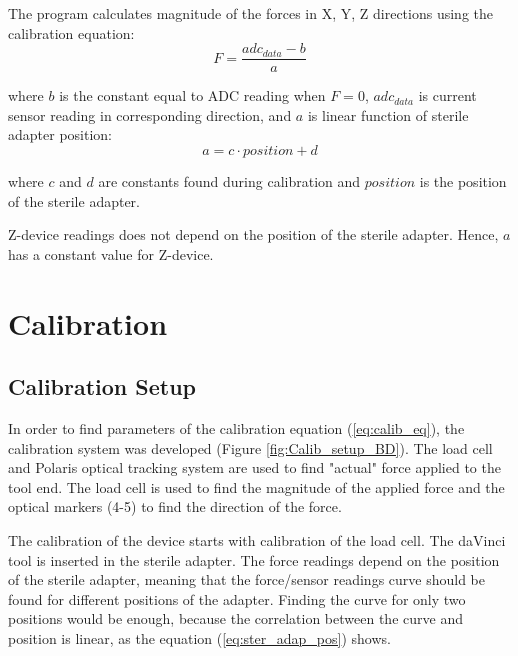 The program calculates magnitude of the forces in X, Y, Z directions using the calibration equation:
\begin{equation}\label{eq:calib_eq}
F = \frac{adc_{data} - b}{a}
\end{equation}

where $b$ is the constant equal to ADC reading when $F = 0$, $adc_{data}$ is current sensor reading in corresponding direction, and $a$ is linear function of sterile adapter position:
\begin{equation}\label{eq:ster_adap_pos}
a = c \cdot position + d
\end{equation}

where $c$ and $d$ are constants found during calibration and $position$ is the position of the sterile adapter.

Z-device readings does not depend on the position of the sterile adapter. Hence, $a$ has a constant value for Z-device.
 
	
\section{Calibration}
\label{section:Calibration}

	\subsection{Calibration Setup}
	\label{sec:CalSetup}
	In order to find parameters of the calibration equation (\ref{eq:calib_eq}), the calibration system was developed (Figure \ref{fig:Calib_setup_BD}). The load cell and Polaris optical tracking system are used to find "actual" force applied to the tool end. The load cell is used to find the magnitude of the applied force and the optical markers (4-5) to find the direction of the force.
	
	The calibration of the device starts with calibration of the load cell. The daVinci tool is inserted in the sterile adapter.  The force readings depend on the position of the sterile adapter, meaning that the force/sensor readings curve should be found for different positions of the adapter. Finding the curve for only two positions would be enough, because the correlation between the curve and position is linear, as the equation (\ref{eq:ster_adap_pos}) shows. 
	
